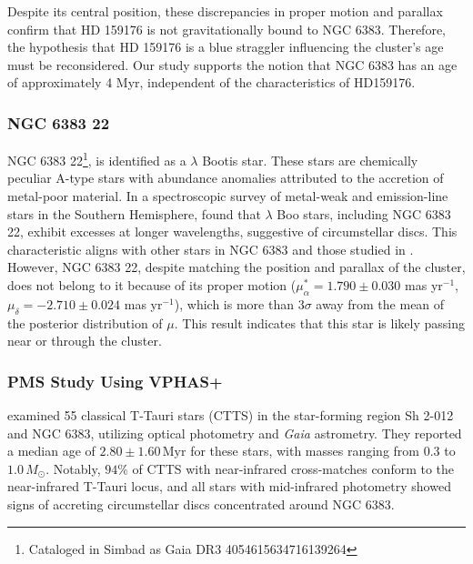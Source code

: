 \documentclass{aa}
\begin{document}
Despite its central position, these discrepancies in proper motion and parallax confirm that HD 159176 is not gravitationally bound to NGC 6383. Therefore, the hypothesis that HD 159176 is a blue straggler influencing the cluster's age must be reconsidered. Our study supports the notion that NGC 6383 has an age of approximately 4 Myr, independent of the characteristics of HD159176.

\subsubsection{NGC 6383 22}
NGC 6383 22\footnote{Cataloged in Simbad as Gaia DR3 4054615634716139264}, is identified as a $\lambda$ Bootis star. These stars are chemically peculiar A-type stars with abundance anomalies attributed to the accretion of metal-poor material. In a spectroscopic survey of metal-weak and emission-line stars in the Southern Hemisphere, \citet{2020MNRAS.499.2701M} found that $\lambda$ Boo stars, including NGC 6383 22, exhibit excesses at longer wavelengths, suggestive of circumstellar discs. This characteristic aligns with other stars in NGC 6383 and those studied in \citet{2019MNRAS.484.5102K}. However, NGC 6383 22, despite matching the position and parallax of the cluster, does not belong to it because of its proper motion ($\mu_\alpha^* = 1.790 \pm 0.030$ mas yr$^{-1}$, $\mu_\delta = -2.710 \pm 0.024$ mas yr$^{-1}$), which is more than $3\sigma$ away from the mean of the posterior distribution of $\mu$. This result indicates that this star is likely passing near or through the cluster.

\subsubsection{PMS Study Using VPHAS+}

\citet{2019MNRAS.484.5102K} examined 55 classical T-Tauri stars (CTTS) in the star-forming region Sh 2-012 and NGC 6383, utilizing optical photometry and \textit{Gaia} astrometry. They reported a median age of $2.80 \pm 1.60\,\mathrm{Myr}$ for these stars, with masses ranging from $0.3$ to $1.0\,M_\odot$. Notably, $94\%$ of CTTS with near-infrared cross-matches conform to the near-infrared T-Tauri locus, and all stars with mid-infrared photometry showed signs of accreting circumstellar discs concentrated around NGC 6383.
\end{document}
